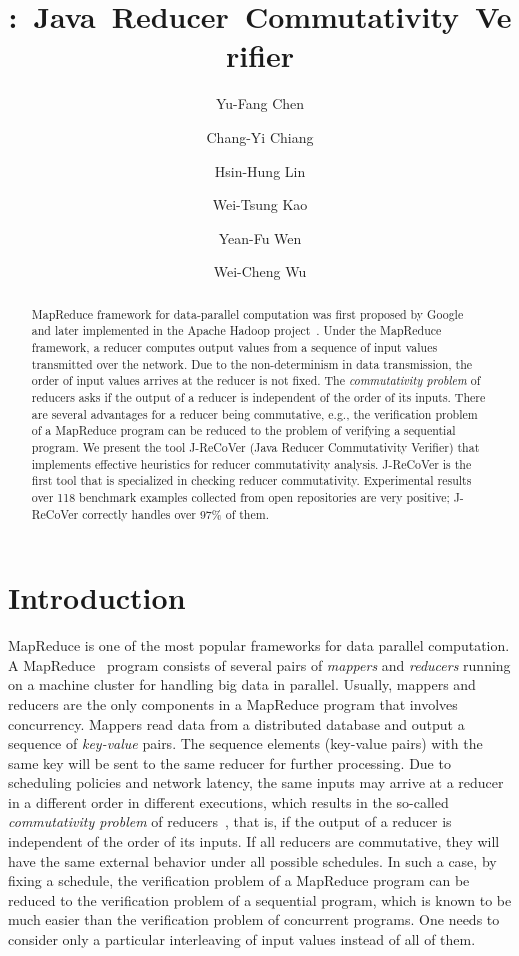 \documentclass{llncs}
\title{\hspace{-0.1cm}{J-ReCoVer}:~Java~Reducer~Commutativity~Verifier}
\author{}
\institute{}
\author{
Yu-Fang Chen\inst{1}\inst{2}
\and
Chang-Yi Chiang\inst{2}
\and
Hsin-Hung Lin\inst{1}
\and
Wei-Tsung Kao\inst{1}
\and
Yean-Fu Wen\inst{2}
\and
Wei-Cheng Wu\inst{1}
}
\institute
{
Institute of Information Science, Academia Sinica, Taiwan
\and
Graduate Institute of Information Management, National Taipei University, Taiwan
}}
\author{}
\institute{}
\begin{document}
\maketitle

\begin{abstract}

MapReduce framework for data-parallel computation was first proposed by Google~\cite{dean04} and later implemented in the Apache Hadoop project~\cite{hadoop}.
Under the MapReduce framework, a reducer computes output values from a sequence of input values transmitted over the network.  Due to the non-determinism in data transmission, the order of input values arrives at the reducer is not fixed.
The \emph{commutativity problem} of reducers asks if the output of a reducer is independent of the order of its inputs. There are several advantages for a reducer being commutative, e.g., the verification problem of a MapReduce program can be reduced to the problem of verifying a sequential program.
We present the tool J-ReCoVer (Java Reducer Commutativity Verifier) that implements effective heuristics for reducer commutativity analysis. J-ReCoVer is the first tool that is specialized in checking reducer commutativity. Experimental results over 118 benchmark examples collected from open repositories are very positive; J-ReCoVer correctly handles over 97\% of them.

\end{abstract}

\section{Introduction}
\label{section:introduction}

MapReduce is one of the most popular frameworks for data parallel computation.
A MapReduce~\cite{dean04,hadoop} program consists of several pairs of \emph{mappers} and \emph{reducers} running on a machine cluster for handling big data in parallel. Usually, mappers and reducers are the only components in a MapReduce program that involves concurrency. Mappers read data from a distributed database and output a sequence of \emph{key-value} pairs. The sequence elements (key-value pairs) with the same key will be sent to the same reducer for further processing. Due to scheduling policies and network latency, the same inputs may arrive at a reducer in a different order in different executions, which results in the so-called \emph{commutativity problem} of reducers~\cite{csallner13testing,xiao14mr,ChenHSW15,ChenSW16}, that is, if the output of a reducer is independent of the order of its inputs.
If all reducers are commutative, they will have the same external behavior under all possible schedules. In such a case, by fixing a schedule, the verification problem of a MapReduce program can be reduced to the verification problem of a sequential program, which is known to be much easier than the verification problem of concurrent programs. One needs to consider only a particular interleaving of input values instead of all of them.
\end{document}
